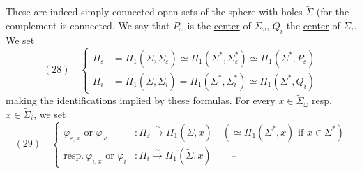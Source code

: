 These are indeed  simply connected open sets  of the sphere with holes $\widetilde\Sigma$ (for the complement is connected. We say that $P_\omega$ is the \uline{center} of $\widetilde\Sigma_\omega$, $Q_i$ the \uline{center} of $\widetilde\Sigma_i$.
We set
\[
(28)\quad\left\{\begin{aligned}
\Pi_\varepsilon&=\Pi_1(\widetilde\Sigma,\widetilde\Sigma_\varepsilon)\simeq\Pi_1(\Sigma^*,\Sigma_\varepsilon^*)\simeq\Pi_1(\Sigma^*,P_\varepsilon)\\
\Pi_i&=\Pi_1(\widetilde\Sigma,\widetilde\Sigma_i)=\Pi_1(\Sigma^*,\Sigma_i^*)\simeq\Pi_1(\Sigma^*,Q_i)
\end{aligned}\right.
\]
making the identifications implied by these formulas.  For every $x\in\widetilde\Sigma_\omega$ resp. $x\in\widetilde\Sigma_i$, we set
\[
(29)\quad\left\{\begin{aligned}
\varphi_{\varepsilon,x}\text{ or }\varphi_\omega&:\Pi_\varepsilon\xrightarrow{\sim}\Pi_1(\widetilde\Sigma,x)\quad(\simeq\Pi_1(\Sigma^*,x)\text{ if }x\in\Sigma^*)\\
\text{resp.}\ \varphi_{i,x}\text{ or }\varphi_i&:\Pi_i\xrightarrow{\sim}\Pi_1(\widetilde\Sigma,x)\qquad\text{--}
\end{aligned}\right.
\]
